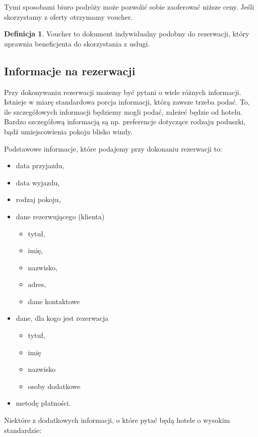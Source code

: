 \documentclass[a4paper,onecolumn,oneside,11pt,wide,floatssmall]{mwrep}
\theoremstyle{definition}
\newtheorem{defn}{Definicja}[section]
\theoremstyle{plain}%
\theoremstyle{remark}
\begin{document}
Tymi sposobami biuro podróży może pozwolić sobie zaoferować niższe ceny. 
Jeśli skorzystamy z oferty otrzymamy voucher.

\begin{defn}{Voucher} 
to dokument indywidualny podobny do rezerwacji, który uprawnia beneficjenta 
do skorzystania z usługi.
\end{defn}

\subsection{Informacje na rezerwacji}
\label{chap1:info-na-rezerwacji}
Przy dokonywaniu rezerwacji możemy być pytani o wiele różnych informacji. 
Istnieje w miarę standardowa porcja informacji, którą zawsze trzeba podać. 
To, ile szczegółowych informacji będziemy mogli podać, zależeć będzie od 
\mbox{hotelu.} Bardzo szczegółową informacją są np. preferencje dotyczące 
rodzaju poduszki, bądź umiejscowienia pokoju blisko windy.

Podstawowe informacje, które podajemy przy dokonaniu rezerwacji to:

\begin{itemize}
  \item data przyjazdu,
  \item data wyjazdu,
  \item rodzaj pokoju,
  \item dane rezerwującego (klienta)
  \begin{itemize}
    \item tytuł,
    \item imię,
    \item nazwisko, 
    \item adres, 
    \item dane kontaktowe
  \end{itemize} 
  \item dane, dla kogo jest rezerwacja
  \begin{itemize}
    \item tytuł,
    \item imię
    \item nazwisko
    \item osoby dodatkowe
  \end{itemize}
  \item metodę płatności.
\end{itemize}

Niektóre z dodatkowych informacji, o które pytać będą hotele o wysokim 
standardzie:
\end{document}
